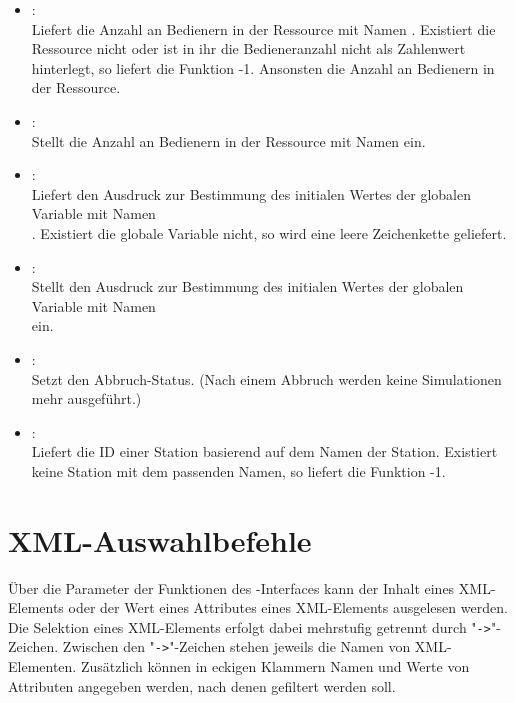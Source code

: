 \begin{itemize}
\item
{}:\\
Liefert die Anzahl an Bedienern in der Ressource mit Namen .
Existiert die Ressource nicht oder ist in ihr die Bedieneranzahl nicht als Zahlenwert
hinterlegt, so liefert die Funktion -1. Ansonsten die Anzahl an Bedienern in der
Ressource.

\item
{}:\\
Stellt die Anzahl an Bedienern in der Ressource mit Namen  ein.

\item
{}:\\
Liefert den Ausdruck zur Bestimmung des initialen Wertes der globalen Variable
mit Namen\\. Existiert die globale Variable nicht, so wird
eine leere Zeichenkette geliefert.

\item
{}:\\
Stellt den Ausdruck zur Bestimmung des initialen Wertes der globalen Variable
mit Namen\\ ein. 

\item
{}:\\
Setzt den Abbruch-Status. (Nach einem Abbruch werden keine Simulationen mehr ausgeführt.)

\item
{}:\\
Liefert die ID einer Station basierend auf dem Namen der Station.
Existiert keine Station mit dem passenden Namen, so liefert die Funktion -1.

\end{itemize}



\chapter{XML-Auswahlbefehle}

Über die Parameter der Funktionen des -Interfaces kann der Inhalt eines XML-Elements oder der Wert eines
Attributes eines XML-Elements ausgelesen werden. Die Selektion eines XML-Elements erfolgt dabei mehrstufig
getrennt durch "\texttt{->}"-Zeichen. Zwischen den "\texttt{->}"-Zeichen stehen jeweils die Namen von XML-Elementen.
Zusätzlich können in eckigen Klammern Namen und Werte von Attributen angegeben werden, nach denen gefiltert werden soll.

